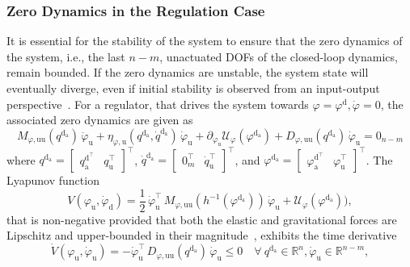 \subsubsection{Zero Dynamics in the Regulation Case}
It is essential for the stability of the system to ensure that the zero dynamics of the system, i.e., the last $n-m$, unactuated \glspl{DOF} of the closed-loop dynamics, remain bounded. If the zero dynamics are unstable, the system state will eventually diverge, even if initial stability is observed from an input-output perspective~\citep{pustina2025analysis}.
For a regulator, that drives the system towards $\varphi = \varphi^\mathrm{d}, \dot{\varphi} = 0$, the associated zero dynamics are given as~\citep{pustina2025analysis}
\begin{equation}
    M_{\varphi,\mathrm{uu}}(q^{\mathrm{d}_\mathrm{a}}) \, \ddot{\varphi}_\mathrm{u} + \eta_{\varphi,\mathrm{u}}(q^{\mathrm{d}_\mathrm{a}},\dot{q}^{\mathrm{d}_\mathrm{a}}) \, \dot{\varphi}_\mathrm{u} + \partial_{\varphi_\mathrm{u}} \mathcal{U}_\varphi(\varphi^{\mathrm{d}_\mathrm{a}}) + D_{\varphi,\mathrm{uu}}(q^{\mathrm{d}_\mathrm{a}}) \, \dot{\varphi}_\mathrm{u} = 0_{n-m}
\end{equation}
where $q^{\mathrm{d}_\mathrm{a}} = \begin{bmatrix}
    q_\mathrm{a}^{\mathrm{d}^\top} & q_\mathrm{u}^{\top}
\end{bmatrix}^\top$, $\dot{q}^{\mathrm{d}_\mathrm{a}} = \begin{bmatrix}
    0_m^\top & \dot{q}_\mathrm{u}^{\top}
\end{bmatrix}^\top$, and $\varphi^{\mathrm{d}_\mathrm{a}} = \begin{bmatrix}
    \varphi_\mathrm{a}^{\mathrm{d}^\top} & \varphi_\mathrm{u}^{\top}
\end{bmatrix}^\top$.
The Lyapunov function
\begin{equation}
    V(\varphi_\mathrm{u},\dot{\varphi}_\mathrm{d}) = \frac{1}{2} \, \dot{\varphi}_\mathrm{u}^\top \, M_{\varphi,\mathrm{uu}}(h^{-1}(\varphi^{\mathrm{d}_\mathrm{a}})) \, \dot{\varphi}_\mathrm{u} + \mathcal{U}_\varphi(\varphi^{\mathrm{d}_\mathrm{a}})),
\end{equation}
that is non-negative provided that both the elastic and gravitational forces are Lipschitz and upper-bounded in their magnitude~\citep{pustina2025analysis}, exhibits the time derivative
\begin{equation}
    \dot{V}(\varphi_\mathrm{u},\dot{\varphi}_\mathrm{u}) = -\dot{\varphi}_\mathrm{u}^\top \, D_{\varphi,\mathrm{uu}}(q^{\mathrm{d}_\mathrm{a}}) \, \dot{\varphi}_\mathrm{u} \leq 0 \quad \forall \:  q^{\mathrm{d}_\mathrm{a}} \in \mathbb{R}^{n}, \dot{\varphi}_\mathrm{u} \in \mathbb{R}^{n-m},
\end{equation}

